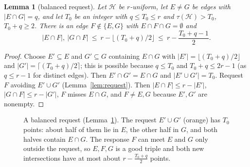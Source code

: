 \documentclass[11pt]{amsart}
\newtheorem{lemma}[theorem]{Lemma}
\theoremstyle{definition}
\theoremstyle{remark}
\newcommand{\cH}{\mathcal H}
\newcommand{\ceil}[1]{\lceil #1\rceil}
\newcommand{\floor}[1]{\lfloor #1\rfloor}
\begin{document}
\begin{lemma}[balanced request]\label{lem:balanced}
Let $\cH$ be $r$-uniform, let $E\ne G$ be edges with $|E\cap G|=q$, and let $T_0$ be an integer with $q\le T_0\le r$ and $\tau(\cH)>T_0$, $T_0+q\ge2$. There is an edge $F\notin\{E,G\}$ with $E\cap F\cap G=\emptyset$ and
\[
|E\cap F|,\ |G\cap F|\ \le\ r-\floor{(T_0+q)/2}\ \le\ r-\frac{T_0+q-1}{2}.
\]
\end{lemma}
\begin{proof}
Choose $E'\subseteq E$ and $G'\subseteq G$ containing $E\cap G$ with $|E'|=\floor{(T_0+q)/2}$ and $|G'|=\ceil{(T_0+q)/2}$; this is possible because $q\le T_0$ and $T_0+q\le 2r-1$ (as $q\le r-1$ for distinct edges). Then $E'\cap G'=E\cap G$ and $|E'\cup G'|=T_0$. Request $F$ avoiding $E'\cup G'$ (Lemma~\ref{lem:request}). Then $|E\cap F|\le r-|E'|$, $|G\cap F|\le r-|G'|$, $F$ misses $E\cap G$, and $F\ne E,G$ because $E',G'$ are nonempty.
\end{proof}

\begin{figure}[htb]
\centering
{}
\caption{A balanced request (Lemma~\ref{lem:balanced}). The request $E'\cup G'$ (orange) has $T_0$ points: about half of them lie in $E$, the other half in $G$, and both halves contain $E\cap G$. The response $F$ can meet $E$ and $G$ only outside the request, so $E,F,G$ is a good triple and both new intersections have at most about $r-\frac{T_0+q}{2}$ points.}\label{fig:balanced}
\end{figure}
\end{document}
